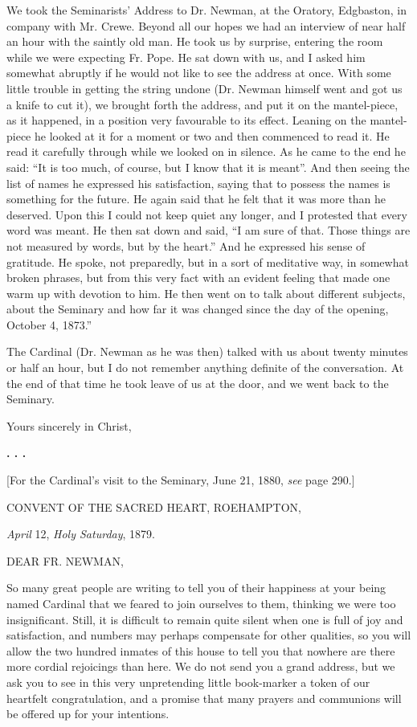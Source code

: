We took the Seminarists' Address to Dr. Newman, at the Oratory,
Edgbaston, in company with Mr. Crewe. Beyond all our hopes we had an
interview of near half an hour with the saintly old man. He took us by
surprise, entering the room while we were expecting Fr. Pope. He sat
down with us, and I asked him somewhat abruptly if he would not like
to see the address at once. With some little trouble in getting the string undone (Dr. Newman himself went and got
us a knife to cut it), we brought forth the address, and put it on the
mantel-piece, as it happened, in a position very favourable to its
effect. Leaning on the mantel-piece he looked at it for a moment or
two and then commenced to read it. He read it carefully through while
we looked on in silence. As he came to the end he said: ``It is
too much, of course, but I know that it is meant''. And then
seeing the list of names he expressed his satisfaction, saying that to
possess the names is something for the future. He again said that he
felt that it was more than he deserved. Upon this I could not keep
quiet any longer, and I protested that every word was meant. He then
sat down and said, ``I am sure of that. Those things are not
measured by words, but by the heart.'' And he expressed his sense
of gratitude. He spoke, not preparedly, but in a sort of meditative
way, in somewhat broken phrases, but from this very fact with an
evident feeling that made one warm up with devotion to him. He then
went on to talk about different subjects, about the Seminary and how
far it was changed since the day of the opening, October 4,
1873.''

The Cardinal (Dr. Newman as he was then) talked with us about
twenty minutes or half an hour, but I do not remember anything
definite of the conversation. At the end of that time he took leave of
us at the door, and we went back to the Seminary.

Yours sincerely in Christ,

\textbf{. . .}

[For the Cardinal's visit to the Seminary, June 21, 1880, \emph{see}
page 290.]


CONVENT OF THE
SACRED HEART, ROEHAMPTON,

\emph{April} 12, \emph{Holy Saturday}, 1879.

DEAR FR. NEWMAN,

So many great people are writing to tell you of their happiness at
your being named Cardinal that we feared to join ourselves to them,
thinking we were too insignificant. Still, it is difficult to remain
quite silent when one is full of joy and satisfaction, and numbers may
perhaps compensate for other qualities, so you will allow the two
hundred inmates of this house to tell you that nowhere are there more
cordial rejoicings than here. We do not send you a grand address, but
we ask you to see in this very unpretending little book-marker a token
of our heartfelt congratulation, and a promise that many prayers and
communions will be offered up for your intentions.

